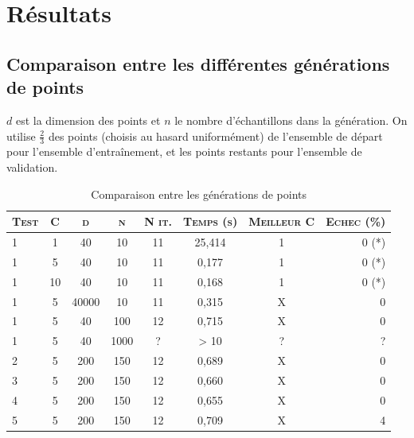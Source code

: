 \documentclass{article}
\begin{document}
\section{Résultats}

\subsection{Comparaison entre les différentes générations de points}

$d$ est la dimension des points et $n$ le nombre d'échantillons dans la génération. On utilise $\frac{2}{3}$ des points (choisis au hasard uniformément) de l'ensemble de départ pour l'ensemble d'entraînement, et les points restants pour l'ensemble de validation. \\

     \begin{table}[H]
       \caption{Comparaison entre les générations de points}
       \begin{tabular}{|l|c|c|c|c|c|c|r|}
         \hline
         \textsc{Test} & \textsc{C} & \textsc{d} & \textsc{n} & \textsc{N it.} & \textsc{Temps (s)} & \textsc{Meilleur C} & \textsc{Echec (\%)}\\
         \hline
         1 & 1 & 40 & 10 & 11 & 25,414 & 1 & 0 (*)\\
         \hline
         1 & 5 & 40 & 10 & 11 & 0,177 & 1 & 0 (*)\\
         \hline
         1 & 10 & 40 & 10 & 11 & 0,168 & 1 & 0 (*)\\
         \hline
         1 & 5 & 40000 & 10 & 11 & 0,315 & X & 0\\
         \hline
         1 & 5 & 40 & 100 & 12 & 0,715 & X & 0\\
         \hline
         1 & 5 & 40 & 1000 & ? & > 10 & ? & ?\\
         \hline
         2 & 5 & 200 & 150 & 12 & 0,689 & X & 0\\
         \hline
         3 & 5 & 200 & 150 & 12 & 0,660 & X & 0\\
         \hline
         4 & 5 & 200 & 150 & 12 & 0,655 & X & 0\\
         \hline
         5 & 5 & 200 & 150 & 12 & 0,709 & X & 4\\
         \hline
       \end{tabular}
     \end{table}
\end{document}
